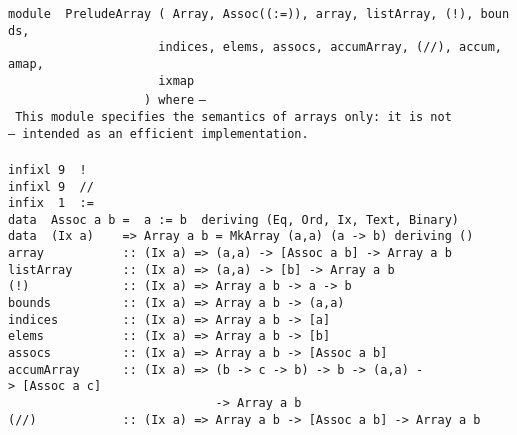 \noindent\bprogB
\mbox{\tt module\ \ PreludeArray\ (\ Array,\ Assoc((:=)),\ array,\ listArray,\ (!),\ bounds,}\\
\mbox{\tt \ \ \ \ \ \ \ \ \ \ \ \ \ \ \ \ \ \ \ \ \ indices,\ elems,\ assocs,\ accumArray,\ (//),\ accum,\ amap,}\\
\mbox{\tt \ \ \ \ \ \ \ \ \ \ \ \ \ \ \ \ \ \ \ \ \ ixmap}\\
\mbox{\tt \ \ \ \ \ \ \ \ \ \ \ \ \ \ \ \ \ \ \ )\ where}
%
\eprogB\noindent\bprogB
\mbox{\tt --\ This\ module\ specifies\ the\ semantics\ of\ arrays\ only:\ it\ is\ not}\\
\mbox{\tt --\ intended\ as\ an\ efficient\ implementation.}\\
\mbox{\tt }\\[-8pt]
\mbox{\tt infixl\ 9\ \ !}\\
\mbox{\tt infixl\ 9\ \ //}\\
\mbox{\tt infix\ \ 1\ \ :=}
%
%
%
\eprogB\noindent\bprogB
\mbox{\tt data\ \ Assoc\ a\ b\ =\ \ a\ :=\ b\ \ deriving\ (Eq,\ Ord,\ Ix,\ Text,\ Binary)}\\
\mbox{\tt data\ \ (Ix\ a)\ \ \ \ =>\ Array\ a\ b\ =\ MkArray\ (a,a)\ (a\ ->\ b)\ deriving\ ()}
%
\eprogB\noindent\bprogB
\mbox{\tt array\ \ \ \ \ \ \ \ \ \ \ ::\ (Ix\ a)\ =>\ (a,a)\ ->\ [Assoc\ a\ b]\ ->\ Array\ a\ b}\\
\mbox{\tt listArray\ \ \ \ \ \ \ ::\ (Ix\ a)\ =>\ (a,a)\ ->\ [b]\ ->\ Array\ a\ b}\\
\mbox{\tt (!)\ \ \ \ \ \ \ \ \ \ \ \ \ ::\ (Ix\ a)\ =>\ Array\ a\ b\ ->\ a\ ->\ b}\\
\mbox{\tt bounds\ \ \ \ \ \ \ \ \ \ ::\ (Ix\ a)\ =>\ Array\ a\ b\ ->\ (a,a)}\\
\mbox{\tt indices\ \ \ \ \ \ \ \ \ ::\ (Ix\ a)\ =>\ Array\ a\ b\ ->\ [a]}\\
\mbox{\tt elems\ \ \ \ \ \ \ \ \ \ \ ::\ (Ix\ a)\ =>\ Array\ a\ b\ ->\ [b]}\\
\mbox{\tt assocs\ \ \ \ \ \ \ \ \ \ ::\ (Ix\ a)\ =>\ Array\ a\ b\ ->\ [Assoc\ a\ b]}\\
\mbox{\tt accumArray\ \ \ \ \ \ ::\ (Ix\ a)\ =>\ (b\ ->\ c\ ->\ b)\ ->\ b\ ->\ (a,a)\ ->\ [Assoc\ a\ c]}\\
\mbox{\tt \ \ \ \ \ \ \ \ \ \ \ \ \ \ \ \ \ \ \ \ \ \ \ \ \ \ \ \ \ ->\ Array\ a\ b}\\
\mbox{\tt (//)\ \ \ \ \ \ \ \ \ \ \ \ ::\ (Ix\ a)\ =>\ Array\ a\ b\ ->\ [Assoc\ a\ b]\ ->\ Array\ a\ b}\\
